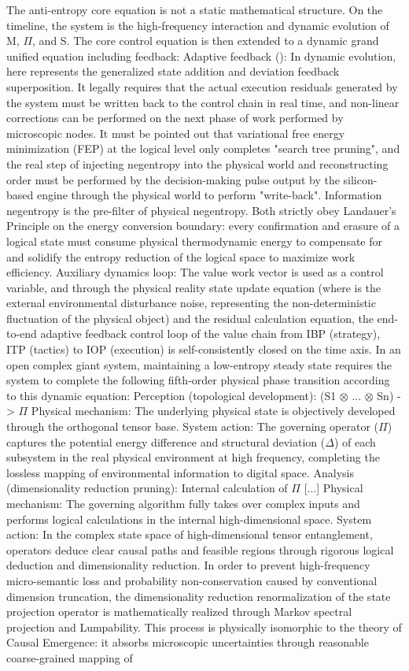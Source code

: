 \documentclass[11pt,a4paper]{article}
\begin{document}
The anti-entropy core equation is not a static mathematical structure. On the timeline, the system is the high-frequency interaction and dynamic evolution of M, $\Pi$, and S. The core control equation is then extended to a dynamic grand unified equation including feedback: Adaptive feedback (): In dynamic evolution, here represents the generalized state addition and deviation feedback superposition. It legally requires that the actual execution residuals generated by the system must be written back to the control chain in real time, and non-linear corrections can be performed on the next phase of work performed by microscopic nodes. It must be pointed out that variational free energy minimization (FEP) at the logical level only completes "search tree pruning", and the real step of injecting negentropy into the physical world and reconstructing order must be performed by the decision-making pulse output by the silicon-based engine through the physical world to perform "write-back". Information negentropy is the pre-filter of physical negentropy. Both strictly obey Landauer's Principle on the energy conversion boundary: every confirmation and erasure of a logical state must consume physical thermodynamic energy to compensate for and solidify the entropy reduction of the logical space to maximize work efficiency. Auxiliary dynamics loop: The value work vector is used as a control variable, and through the physical reality state update equation (where is the external environmental disturbance noise, representing the non-deterministic fluctuation of the physical object) and the residual calculation equation, the end-to-end adaptive feedback control loop of the value chain from IBP (strategy), ITP (tactics) to IOP (execution) is self-consistently closed on the time axis. In an open complex giant system, maintaining a low-entropy steady state requires the system to complete the following fifth-order physical phase transition according to this dynamic equation: Perception (topological development): (S1 $\otimes$ ... $\otimes$ Sn) -> $\Pi$ Physical mechanism: The underlying physical state is objectively developed through the orthogonal tensor base. System action: The governing operator ($\Pi$) captures the potential energy difference and structural deviation ($\Delta$) of each subsystem in the real physical environment at high frequency, completing the lossless mapping of environmental information to digital space. Analysis (dimensionality reduction pruning): Internal calculation of $\Pi$ [...] Physical mechanism: The governing algorithm fully takes over complex inputs and performs logical calculations in the internal high-dimensional space. System action: In the complex state space of high-dimensional tensor entanglement, operators deduce clear causal paths and feasible regions through rigorous logical deduction and dimensionality reduction. In order to prevent high-frequency micro-semantic loss and probability non-conservation caused by conventional dimension truncation, the dimensionality reduction renormalization of the state projection operator is mathematically realized through Markov spectral projection and Lumpability. This process is physically isomorphic to the theory of Causal Emergence: it absorbs microscopic uncertainties through reasonable coarse-grained mapping of 
\end{document}
